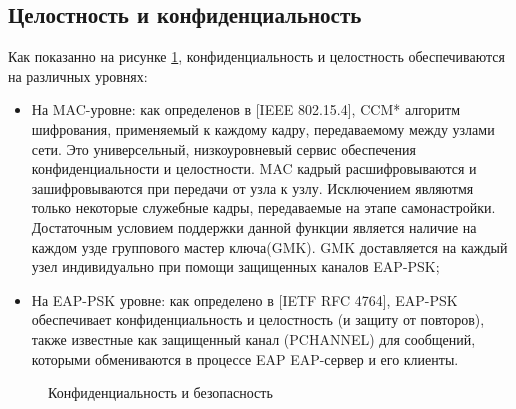 \subsection{Целостность и конфиденциальность}

Как показанно на рисунке \ref{img:10-2}, конфиденциальность и целостность обеспечиваются на различных уровнях:
\begin{itemize}
 \item На MAC-уровне: как определенов в [IEEE 802.15.4], CCM* алгоритм шифрования, применяемый к каждому кадру, передаваемому между узлами сети. Это универсельный, низкоуровневый сервис обеспечения конфиденциальности и целостности. MAC кадрый расшифровываются и зашифровываются при передачи от узла к узлу. Исключением являютмя только некоторые служебные кадры, передаваемые на этапе самонастройки. Достаточным условием поддержки данной функции является наличие на каждом узде группового мастер ключа(GMK). GMK доставляется на каждый узел индивидуально при помощи защищенных каналов EAP-PSK;
 \item На EAP-PSK уровне: как определено в [IETF RFC 4764], EAP-PSK обеспечивает конфиденциальность и целостность (и защиту от повторов), также известные как защищенный канал (PCHANNEL) для сообщений, которыми обмениваются в процессе EAP EAP-сервер и его клиенты.
\end{itemize}

\begin{figure}[h]
\caption{Конфиденциальность и безопасность}
\label{img:10-2}
\end{figure}

